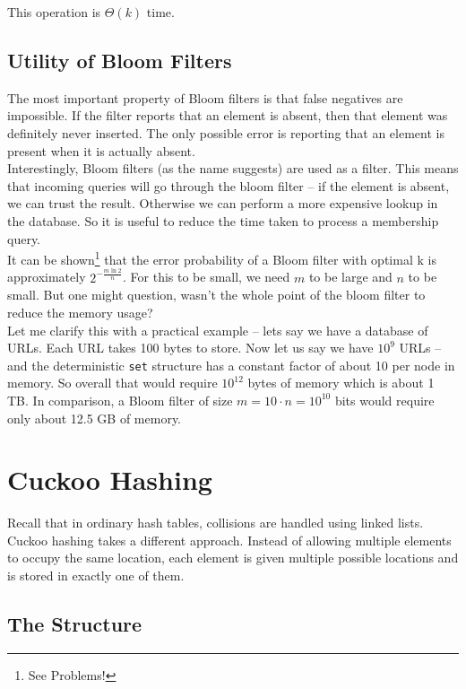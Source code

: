 \noindent This operation is $\Theta(k)$ time.
\subsection{Utility of Bloom Filters}

The most important property of Bloom filters is that false negatives are impossible. If the filter 
reports that an element is absent, then that element was definitely never inserted. The only possible 
error is reporting that an element is present when it is actually absent.\\


Interestingly, Bloom filters (as the name suggests) are used as a filter. This means that incoming 
queries will go through the bloom filter -- if the element is absent, we can trust the result. Otherwise we can 
perform a more expensive lookup in the database. So it is useful to reduce the time taken to process a 
membership query.\\


\noindent It can be shown\footnote{See Problems!} that the error probability of a Bloom filter with 
optimal k is approximately $2^{-\frac{m\ln 2}{n}}$. For this to be small, we need $m$ to be large and $n$ to be small. But one might question, wasn't the 
whole point of the bloom filter to reduce the memory usage?\\

\noindent Let me clarify this with a practical example -- lets say we have a database of URLs. 
Each URL takes 100 bytes to store. Now let us say we have $10^9$ URLs -- and the deterministic \texttt{set} structure 
has a constant factor of about 10 per node in memory. So overall that would require $10^{12}$ bytes of memory which is about 1 TB.
In comparison, a Bloom filter of size $m=10\cdot n = 10^{10}$ bits would require only about 12.5 GB of memory.\\

\section{Cuckoo Hashing}
Recall that in ordinary hash tables, collisions are handled using linked lists. Cuckoo hashing takes a 
different approach. Instead of allowing multiple elements to occupy the same location, 
each element is given multiple possible locations and is stored in exactly one of
them.

\subsection{The Structure}

